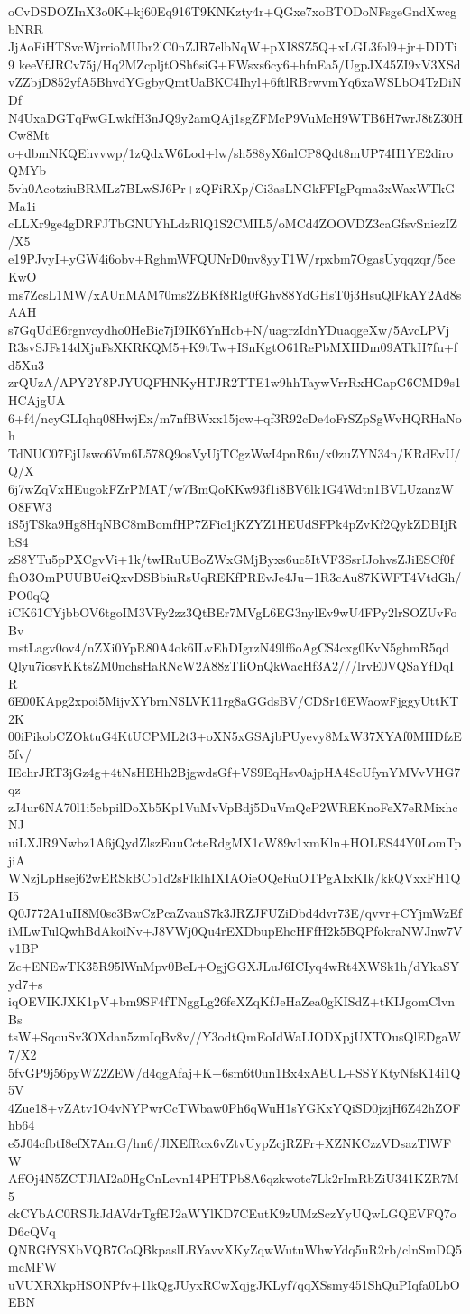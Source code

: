 oCvDSDOZInX3o0K+kj60Eq916T9KNKzty4r+QGxe7xoBTODoNFsgeGndXwcgbNRR
JjAoFiHTSvcWjrrioMUbr2lC0nZJR7elbNqW+pXI8SZ5Q+xLGL3fol9+jr+DDTi9
keeVfJRCv75j/Hq2MZcpljtOSh6siG+FWsxs6cy6+hfnEa5/UgpJX45ZI9xV3XSd
vZZbjD852yfA5BhvdYGgbyQmtUaBKC4Ihyl+6ftlRBrwvmYq6xaWSLbO4TzDiNDf
N4UxaDGTqFwGLwkfH3nJQ9y2amQAj1sgZFMcP9VuMcH9WTB6H7wrJ8tZ30HCw8Mt
o+dbmNKQEhvvwp/1zQdxW6Lod+lw/sh588yX6nlCP8Qdt8mUP74H1YE2diroQMYb
5vh0AcotziuBRMLz7BLwSJ6Pr+zQFiRXp/Ci3asLNGkFFIgPqma3xWaxWTkGMa1i
cLLXr9ge4gDRFJTbGNUYhLdzRlQ1S2CMIL5/oMCd4ZOOVDZ3caGfsvSniezIZ/X5
e19PJvyI+yGW4i6obv+RghmWFQUNrD0nv8yyT1W/rpxbm7OgasUyqqzqr/5ceKwO
ms7ZcsL1MW/xAUnMAM70ms2ZBKf8Rlg0fGhv88YdGHsT0j3HsuQlFkAY2Ad8sAAH
s7GqUdE6rgnvcydho0HeBic7jI9IK6YnHcb+N/uagrzIdnYDuaqgeXw/5AvcLPVj
R3svSJFs14dXjuFsXKRKQM5+K9tTw+ISnKgtO61RePbMXHDm09ATkH7fu+fd5Xu3
zrQUzA/APY2Y8PJYUQFHNKyHTJR2TTE1w9hhTaywVrrRxHGapG6CMD9s1HCAjgUA
6+f4/ncyGLIqhq08HwjEx/m7nfBWxx15jcw+qf3R92cDe4oFrSZpSgWvHQRHaNoh
TdNUC07EjUswo6Vm6L578Q9osVyUjTCgzWwI4pnR6u/x0zuZYN34n/KRdEvU/Q/X
6j7wZqVxHEugokFZrPMAT/w7BmQoKKw93f1i8BV6lk1G4Wdtn1BVLUzanzWO8FW3
iS5jTSka9Hg8HqNBC8mBomfHP7ZFic1jKZYZ1HEUdSFPk4pZvKf2QykZDBIjRbS4
zS8YTu5pPXCgvVi+1k/twIRuUBoZWxGMjByxs6uc5ItVF3SsrIJohvsZJiESCf0f
fhO3OmPUUBUeiQxvDSBbiuRsUqREKfPREvJe4Ju+1R3cAu87KWFT4VtdGh/PO0qQ
iCK61CYjbbOV6tgoIM3VFy2zz3QtBEr7MVgL6EG3nylEv9wU4FPy2lrSOZUvFoBv
mstLagv0ov4/nZXi0YpR80A4ok6ILvEhDIgrzN49lf6oAgCS4cxg0KvN5ghmR5qd
Qlyu7iosvKKtsZM0nchsHaRNcW2A88zTIiOnQkWacHf3A2///lrvE0VQSaYfDqIR
6E00KApg2xpoi5MijvXYbrnNSLVK11rg8aGGdsBV/CDSr16EWaowFjggyUttKT2K
00iPikobCZOktuG4KtUCPML2t3+oXN5xGSAjbPUyevy8MxW37XYAf0MHDfzE5fv/
IEchrJRT3jGz4g+4tNsHEHh2BjgwdsGf+VS9EqHsv0ajpHA4ScUfynYMVvVHG7qz
zJ4ur6NA70l1i5cbpilDoXb5Kp1VuMvVpBdj5DuVmQcP2WREKnoFeX7eRMixhcNJ
uiLXJR9Nwbz1A6jQydZlszEuuCcteRdgMX1cW89v1xmKln+HOLES44Y0LomTpjiA
WNzjLpHsej62wERSkBCb1d2sFlklhIXIAOieOQeRuOTPgAIxKIk/kkQVxxFH1QI5
Q0J772A1uII8M0sc3BwCzPcaZvauS7k3JRZJFUZiDbd4dvr73E/qvvr+CYjmWzEf
iMLwTulQwhBdAkoiNv+J8VWj0Qu4rEXDbupEhcHFfH2k5BQPfokraNWJnw7Vv1BP
Zc+ENEwTK35R95lWnMpv0BeL+OgjGGXJLuJ6ICIyq4wRt4XWSk1h/dYkaSYyd7+s
iqOEVIKJXK1pV+bm9SF4fTNggLg26feXZqKfJeHaZea0gKISdZ+tKIJgomClvnBs
tsW+SqouSv3OXdan5zmIqBv8v//Y3odtQmEoIdWaLIODXpjUXTOusQlEDgaW7/X2
5fvGP9j56pyWZ2ZEW/d4qgAfaj+K+6sm6t0un1Bx4xAEUL+SSYKtyNfsK14i1Q5V
4Zue18+vZAtv1O4vNYPwrCcTWbaw0Ph6qWuH1sYGKxYQiSD0jzjH6Z42hZOFhb64
e5J04cfbtI8efX7AmG/hn6/JlXEfRcx6vZtvUypZcjRZFr+XZNKCzzVDsazTlWFW
AffOj4N5ZCTJlAI2a0HgCnLcvn14PHTPb8A6qzkwote7Lk2rImRbZiU341KZR7M5
ckCYbAC0RSJkJdAVdrTgfEJ2aWYlKD7CEutK9zUMzSczYyUQwLGQEVFQ7oD6cQVq
QNRGfYSXbVQB7CoQBkpaslLRYavvXKyZqwWutuWhwYdq5uR2rb/clnSmDQ5mcMFW
uVUXRXkpHSONPfv+1lkQgJUyxRCwXqjgJKLyf7qqXSsmy451ShQuPIqfa0LbOEBN
